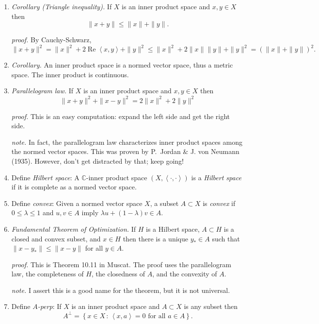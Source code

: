 \documentclass[11pt]{article}
\newcommand{\CC}{\mathbb{C}}
\newcommand{\ip}[2]{\ensuremath{\left<#1,#2\right>}}
\begin{document}
\begin{enumerate}
\item \emph{Corollary (Triangle inequality).}  If $X$ is an inner product space and $x,y\in X$ then
    $$\|x+y\| \le \|x\|+\|y\|.$$

\emph{proof.} By Cauchy-Schwarz,
   $$\|x+y\|^2 = \|x\|^2 + 2 \operatorname{Re}\ip{x}{y} + \|y\|^2 \le \|x\|^2 + 2 \|x\|\|y\| + \|y\|^2 = \left(\|x\|+\|y\|\right)^2.$$

\item \emph{Corollary.}  An inner product space is a normed vector space, thus a metric space.  The inner product is continuous.

\item \emph{Parallelogram law.}  If $X$ is an inner product space and $x,y\in X$ then
    $$\|x+y\|^2 + \|x-y\|^2 = 2 \|x\|^2 + 2 \|y\|^2$$

\emph{proof.} This is an easy computation: expand the left side and get the right side.

\emph{note.}  In fact, the parallelogram law characterizes inner product spaces among the normed vector spaces.  This was proven by P.~Jordan \& J. von Neumann (1935).  However, don't get distracted by that; keep going!

\item Define \emph{Hilbert space}:  A $\CC$-inner product space $(X,\ip{\cdot}{\cdot})$ is a \emph{Hilbert space} if it is complete as a normed vector space.

\item Define \emph{convex}:  Given a normed vector space $X$, a subset $A\subset X$ is \emph{convex} if $0\le \lambda \le 1$ and $u,v\in A$ imply $\lambda u + (1-\lambda) v\in A$.

\item \emph{Fundamental Theorem of Optimization.}  If $H$ is a Hilbert space,  $A \subset H$ is a closed and convex subset, and $x\in H$ then there is a unique $y_* \in A$ such that $\|x-y_*\| \le \|x-y\|$ for all $y\in A$.

\emph{proof.}  This is Theorem 10.11 in Muscat.  The proof uses the parallelogram law, the completeness of $H$, the closedness of $A$, and the convexity of $A$.

\emph{note.}  I assert this is a good name for the theorem, but it is not universal.

\item Define \emph{$A$-perp}:  If $X$ is an inner product space and $A\subset X$ is any subset then
    $$A^\perp = \left\{x\in X \,:\, \ip{x}{a}=0 \text{ for all } a \in A\right\}.$$


\end{enumerate}
\end{document}

